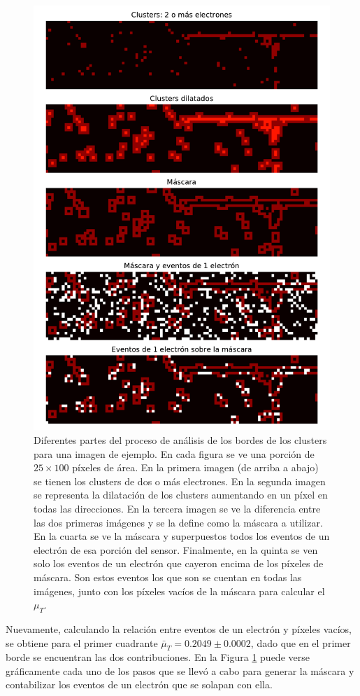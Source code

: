 \begin{figure}[H]
    \centering
    \includegraphics[scale=0.65]{Figs/analisis_bordes.pdf}
    \caption{Diferentes partes del proceso de análisis de los bordes de los clusters para una imagen de ejemplo. En cada figura se ve una porción de $25 \times 100$ píxeles de área. En la primera imagen (de arriba a abajo) se tienen los clusters de dos o más electrones. En la segunda imagen se representa la dilatación de los clusters aumentando en un píxel en todas las direcciones. En la tercera imagen se ve la diferencia entre las dos primeras imágenes y se la define como la máscara a utilizar. En la cuarta se ve la máscara y superpuestos todos los eventos de un electrón de esa porción del sensor. Finalmente, en la quinta se ven solo los eventos de un electrón que cayeron encima de los píxeles de máscara. Son estos eventos los que son se cuentan en todas las imágenes, junto con los píxeles vacíos de la máscara para calcular el $\mu_{T}$.}
    \label{fig:AnalisisBordes}
\end{figure}
Nuevamente, calculando la relación entre eventos de un electrón y píxeles vacíos, se obtiene para el primer cuadrante $\bar{\mu}_{T} = 0.2049 \pm 0.0002$, dado que en el primer borde se encuentran las dos contribuciones. En la Figura \ref{fig:AnalisisBordes} puede verse gráficamente cada uno de los pasos que se llevó a cabo para generar la máscara y contabilizar los eventos de un electrón que se solapan con ella.


